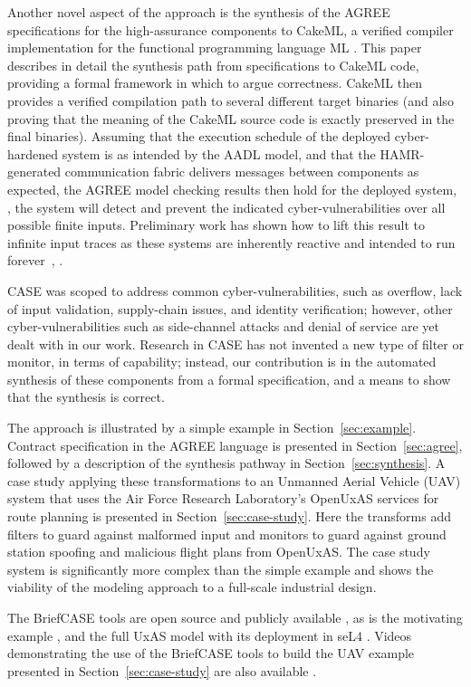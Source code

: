Another novel aspect of the approach is the synthesis of the AGREE
specifications for the high-assurance components to CakeML, a verified
compiler implementation for the functional programming language
ML \cite{cakeml}. This paper describes in detail the synthesis path
from specifications to CakeML code, providing a formal framework in
which to argue correctness. CakeML then provides a verified
compilation path to several different target binaries (and also
proving that the meaning of the CakeML source code is exactly
preserved in the final binaries). Assuming that the execution schedule
of the deployed cyber-hardened system is as intended by the AADL
model, and that the HAMR-generated communication fabric delivers
messages between components as expected, the AGREE model checking
results then hold for the deployed system, \ie, the system will detect
and prevent the indicated cyber-vulnerabilities over all possible
finite inputs. Preliminary work has shown how to lift this result to
infinite input traces as these systems are inherently reactive and
intended to run forever~\cite{case-verified-filter}, \cite{cakeml-space-cost}.

CASE was scoped to address common cyber-vulnerabilities, such as
overflow, lack of input validation, supply-chain issues, and identity
verification; however, other cyber-vulnerabilities such as
side-channel attacks and denial of service are yet dealt with in our
work.  Research in CASE has not invented a new type of filter or
monitor, in terms of capability; instead, our contribution is in the
automated synthesis of these components from a formal specification,
and a means to show that the synthesis is correct.

The approach is illustrated by a simple example in
Section~\ref{sec:example}. Contract specification in the AGREE
language is presented in Section~\ref{sec:agree}, followed by a
description of the synthesis pathway in Section~\ref{sec:synthesis}. A
case study applying these transformations to an Unmanned Aerial
Vehicle (UAV) system that uses the Air Force Research Laboratory's
OpenUxAS services for route planning is presented in
Section~\ref{sec:case-study}. Here the transforms add filters to guard
against malformed input and monitors to guard against ground station
spoofing and malicious flight plans from OpenUxAS. The case study
system is significantly more complex than the simple example and shows
the viability of the modeling approach to a full-scale industrial
design.

The BriefCASE tools are open source and publicly
available \cite{fmide}, as is the motivating example \cite{repo}, and
the full UxAS model with its deployment in seL4 \cite{phase2, camkes}.
Videos demonstrating the use of the BriefCASE tools to build the UAV
example presented in Section~\ref{sec:case-study} are also
available \cite{case}.
